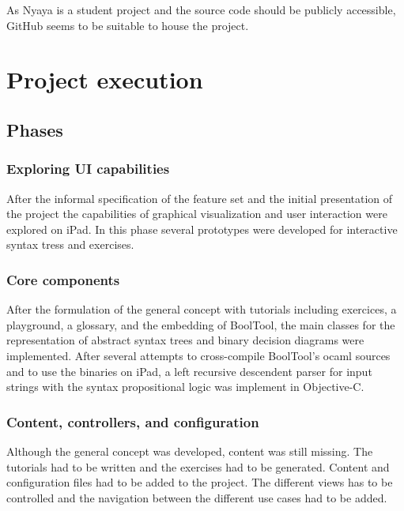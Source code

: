 As Nyaya is a student project and the source code should be publicly accessible,
GitHub seems to be suitable to house the project.

\section{Project execution}

\subsection{Phases}

\subsubsection{Exploring UI capabilities}

After the informal specification of the feature set and the initial presentation of the project
the capabilities of graphical visualization and  user interaction were explored on iPad.
In this phase several prototypes were developed for interactive syntax tress and exercises.

\subsubsection{Core components}


After the formulation of the general concept with tutorials including exercices, a playground, a glossary, and the embedding of BoolTool,
the main classes for the representation of abstract syntax trees and binary decision diagrams were implemented.
After several attempts to cross-compile BoolTool's ocaml sources and to use the binaries on iPad, a left recursive descendent parser for input strings with the syntax propositional logic was implement in Objective-C. 

\subsubsection{Content, controllers, and configuration}

Although the general concept was developed, content was still missing. The tutorials had to be written and the exercises had to be generated. Content and configuration files had to be added to the project. 
The different views has to be controlled and the navigation between the different use cases had to be added. 


